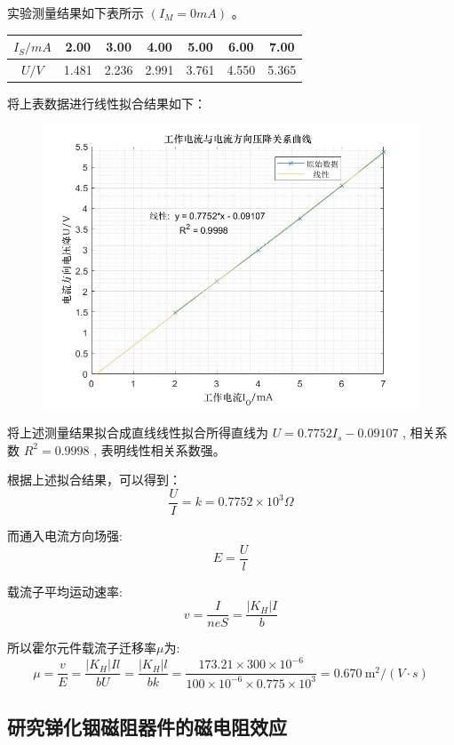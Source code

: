 \documentclass[UTF8]{ctexart}
\begin{document}
实验测量结果如下表所示 $ \left(I_{M}=0 m A\right)$  。

\begin{center}
\begin{tabular}{c|c|c|c|c|c|c}
  \hline $I_{S} / m A$  &  2.00  &  3.00  &  4.00  &  5.00  &  6.00  &  7.00   \\
  \hline $U / V$  &  1.481  &  2.236  &  2.991  &  3.761  &  4.550  &  5.365    \\
  \hline
  \end{tabular}
\end{center}

将上表数据进行线性拟合结果如下：
\begin{figure}[H]
  \centering
  \includegraphics[scale=0.5]{拟合4.jpg}
\end{figure}

将上述测量结果拟合成直线线性拟合所得直线为 $ U=0.7752 I_{s}-0.09107$ , 相关系数 $ R^{2}=0.9998$ , 表明线性相关系数强。

根据上述拟合结果，可以得到：
$$
\frac{U}{I}=k = 0.7752 \times 10^{3} \Omega
$$

而通入电流方向场强:
$$
E=\frac{U}{l}
$$

载流子平均运动速率:
$$
v=\frac{I}{n e S}=\frac{\left|K_{H}\right| I}{b}
$$

所以霍尔元件载流子迁移率$\mu$为:
$$
\mu=\frac{v}{E}=\frac{\left|K_{H}\right| I l}{b U}=\frac{\left|K_{H}\right| l}{bk}=\frac{173.21\times 300 \times 10^{-6}}{100 \times 10^{-6}\times 0.775\times 10^{3}}=0.670 \mathrm{~m}^{2} /(V \cdot s)
$$


\subsection{研究锑化铟磁阻器件的磁电阻效应}
\end{document}
